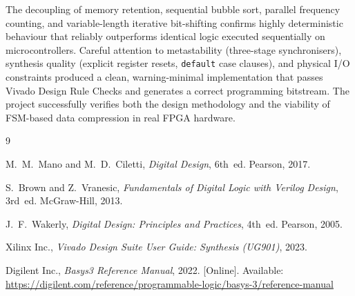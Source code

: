 \documentclass[12pt,a4paper]{article}
\begin{document}
The decoupling of memory retention, sequential bubble sort, parallel frequency counting,
and variable-length iterative bit-shifting confirms highly deterministic behaviour that
reliably outperforms identical logic executed sequentially on microcontrollers. Careful
attention to metastability (three-stage synchronisers), synthesis quality (explicit
register resets, \texttt{default} case clauses), and physical I/O constraints produced
a clean, warning-minimal implementation that passes Vivado Design Rule Checks and
generates a correct programming bitstream. The project successfully verifies both the
design methodology and the viability of FSM-based data compression in real FPGA
hardware.

\begin{thebibliography}{9}

M.~M.~Mano and M.~D.~Ciletti,
\textit{Digital Design}, 6th~ed.
Pearson, 2017.

S.~Brown and Z.~Vranesic,
\textit{Fundamentals of Digital Logic with Verilog Design}, 3rd~ed.
McGraw-Hill, 2013.

J.~F.~Wakerly,
\textit{Digital Design: Principles and Practices}, 4th~ed.
Pearson, 2005.

Xilinx Inc.,
\textit{Vivado Design Suite User Guide: Synthesis (UG901)}, 2023.

Digilent Inc.,
\textit{Basys3 Reference Manual}, 2022.
[Online]. Available: \url{https://digilent.com/reference/programmable-logic/basys-3/reference-manual}

\end{thebibliography}
\end{document}
